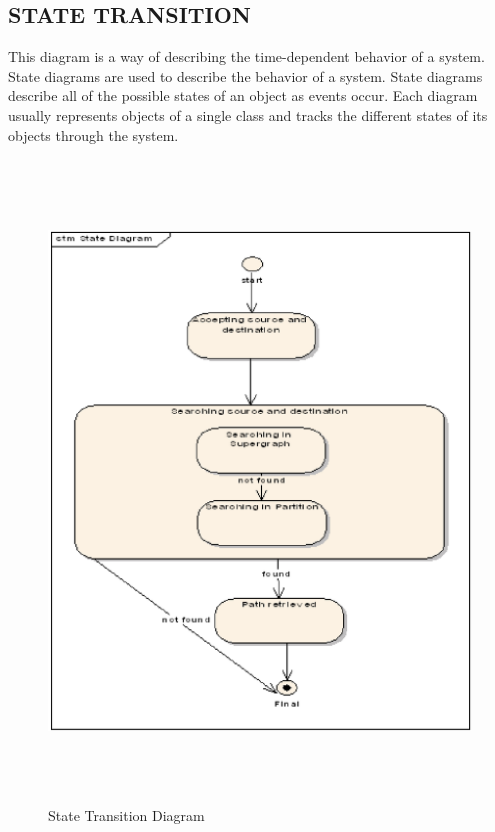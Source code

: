 \begin{center}
\section{\normalsize STATE TRANSITION}
\hspace{5mm} This diagram is a way of describing the time-dependent behavior of a system. State diagrams are used to describe the behavior of a system.  State diagrams describe all of the possible states of an object as events occur.  Each diagram usually represents objects of a single class and tracks the different states of its objects through the system.\\
\begin{figure}[H]
\includegraphics[width=14cm,height=17cm]{state.eps}
\caption{State Transition Diagram}
\end{figure}
\newpage



\end{center}
